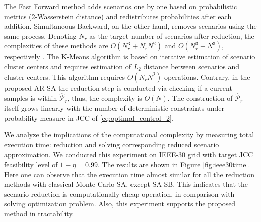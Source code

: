 The Fast Forward method adds scenarios one by one based on probabilistic metrics (2-Wasserstein distance) and redistributes probabilities after each addition. Simultaneous Backward, on the other hand, removes scenarios using the same process. Denoting $N_r$ as the target number of scenarios after reduction, the complexities of these methods are $O(N_r^3 + N_r N^2)$ and $O(N_r^3 + N^3)$, respectively \cite{heitsch2003scenario, rujeerapaiboon2022scenario}. The K-Means algorithm is based on iterative estimation of scenario cluster centers and requires estimation of $L_2$ distance between scenarios and cluster centers. This algorithm requires $O(N_rN^2)$ \cite{pakhira2014linear} operations. Contrary, in the proposed AR-SA the reduction step is conducted via checking if a current samples is within $\hat{\mathcal{P}}_r$, thus, the complexity is $O(N)$. The construction of $\hat{\mathcal{P}}_r$ itself grows linearly with the number of deterministic constraints under probability measure in JCC of \eqref{eq:optimal_control_2}. 

We analyze the implications of the computational complexity by measuring total execution time: reduction and solving corresponding reduced scenario approximation. We conducted this experiment on IEEE-30 grid with target JCC feasibility level of $1-\eta=0.99$. The results are shown in Figure \ref{fig:ieee30time}. Here one can observe that the execution time almost similar for all the reduction methods with classical Monte-Carlo SA, except SA-SB. This indicates that the scenario reduction is computationally cheap operation, in comparison with solving optimization problem. Also, this experiment supports the proposed method in tractability.

